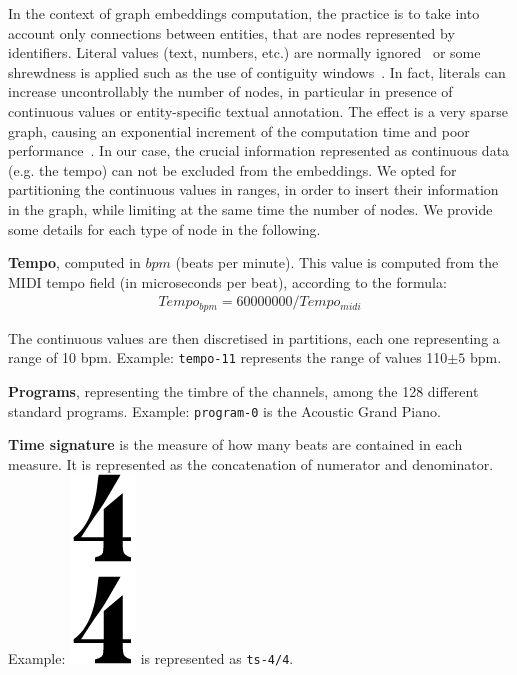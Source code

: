 \documentclass{article}
\begin{document}
In the context of graph embeddings computation, the practice is to take into account only connections between entities, that are nodes represented by identifiers. Literal values (text, numbers, etc.) are normally ignored~\citep{ristoski2018rdf2vec} or some shrewdness is applied such as the use of contiguity windows~\citep{kejriwal2017geonames_embs}. In fact, literals can increase uncontrollably the number of nodes, in particular in presence of continuous values or entity-specific textual annotation. The effect is a very sparse graph, causing an exponential increment of the computation time and poor performance~\citep{pujara2017sparsity}. In our case, the crucial information represented as continuous data (e.g. the tempo) can not be excluded from the embeddings. We opted for partitioning the continuous values in ranges, in order to insert their information in the graph, while limiting at the same time the number of nodes. We provide some details for each type of node in the following.

\textbf{Tempo}, computed in $bpm$ (beats per minute). This value is computed from the MIDI tempo field (in microseconds per beat), according to the formula:
\begin{align}
    Tempo_{bpm} = 60000000/Tempo_{midi}
\end{align}

The continuous values are then discretised in partitions, each one representing a range of 10 bpm. Example: \texttt{tempo-11} represents the range of values 110$\pm5$ bpm. 

\textbf{Programs}, representing the timbre of the channels, among the 128 different standard programs. Example: \texttt{program-0} is the Acoustic Grand Piano.

\textbf{Time signature} is the measure of how many beats are contained in each measure. It is represented as the concatenation of numerator and denominator. Example: \includegraphics[height=2\fontcharht\font`\B]{figs/quattro_quarti.png} is represented as \texttt{ts-4/4}.
\end{document}
